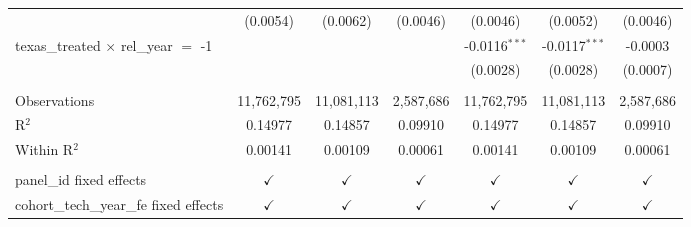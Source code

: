 \begin{tabular}{lcccccc}
                                                & (0.0054)       & (0.0062)       & (0.0046)        & (0.0046)        & (0.0052)        & (0.0046)\\   
   texas\_treated $\times$ rel\_year $=$ -1     &                &                &                 & -0.0116$^{***}$ & -0.0117$^{***}$ & -0.0003\\   
                                                &                &                &                 & (0.0028)        & (0.0028)        & (0.0007)\\   
    \\
   Observations                                 & 11,762,795     & 11,081,113     & 2,587,686       & 11,762,795      & 11,081,113      & 2,587,686\\  
   R$^2$                                        & 0.14977        & 0.14857        & 0.09910         & 0.14977         & 0.14857         & 0.09910\\  
   Within R$^2$                                 & 0.00141        & 0.00109        & 0.00061         & 0.00141         & 0.00109         & 0.00061\\  
    \\
   panel\_id fixed effects                      & $\checkmark$   & $\checkmark$   & $\checkmark$    & $\checkmark$    & $\checkmark$    & $\checkmark$\\   
   cohort\_tech\_year\_fe fixed effects         & $\checkmark$   & $\checkmark$   & $\checkmark$    & $\checkmark$    & $\checkmark$    & $\checkmark$\\   
   \bottomrule
\end{tabular}
\par\endgroup


